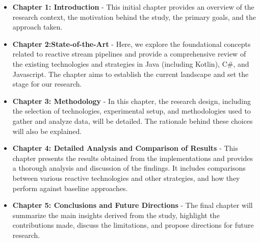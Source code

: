 \begin{itemize}
\item \textbf{Chapter 1: Introduction} - This initial chapter provides an overview of the research context, the motivation behind the study, the primary goals, and the approach taken.

\item \textbf{Chapter 2:State-of-the-Art} - Here, we explore the foundational concepts related to reactive stream pipelines and provide a comprehensive review of the existing technologies and strategies in Java (including Kotlin), C\#, and Javascript. The chapter aims to establish the current landscape and set the stage for our research.

\item \textbf{Chapter 3: Methodology} - In this chapter, the research design, including the selection of technologies, experimental setup, and methodologies used to gather and analyze data, will be detailed. The rationale behind these choices will also be explained.

\item \textbf{Chapter 4: Detailed Analysis and Comparison of Results} - This chapter presents the results obtained from the implementations and provides a thorough analysis and discussion of the findings. It includes comparisons between various reactive technologies and other strategies, and how they perform against baseline approaches.

\item \textbf{Chapter 5: Conclusions and Future Directions} - The final chapter will summarize the main insights derived from the study, highlight the contributions made, discuss the limitations, and propose directions for future research.

\end{itemize}

